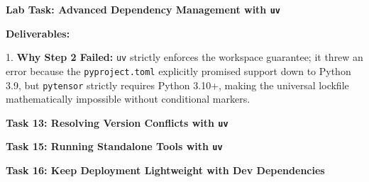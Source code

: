 \documentclass[12pt,a4paper]{article}
\begin{document}
\begin{tcolorbox}
\textbf{Lab Task: Advanced Dependency Management with \texttt{uv}}

\textbf{Deliverables:}

1. \textbf{Why Step 2 Failed:} \texttt{uv} strictly enforces the workspace guarantee; it threw an error because the \texttt{pyproject.toml} explicitly promised support down to Python 3.9, but \texttt{pytensor} strictly requires Python 3.10+, making the universal lockfile mathematically impossible without conditional markers.


\begin{center}

\end{center}


\begin{center}

\end{center}
\end{tcolorbox}

\vspace{6pt}

\begin{tcolorbox}
\textbf{Task 13: Resolving Version Conflicts with \texttt{uv}}

\begin{center}

\end{center}
\end{tcolorbox}

\vspace{6pt}

\begin{tcolorbox}
\textbf{Task 15: Running Standalone Tools with \texttt{uv}}

\begin{center}

\end{center}
\end{tcolorbox}


\begin{tcolorbox}
\textbf{Task 16: Keep Deployment Lightweight with Dev Dependencies}

\begin{center}

\end{center}
\end{tcolorbox}

\vspace{6pt}
\end{document}
